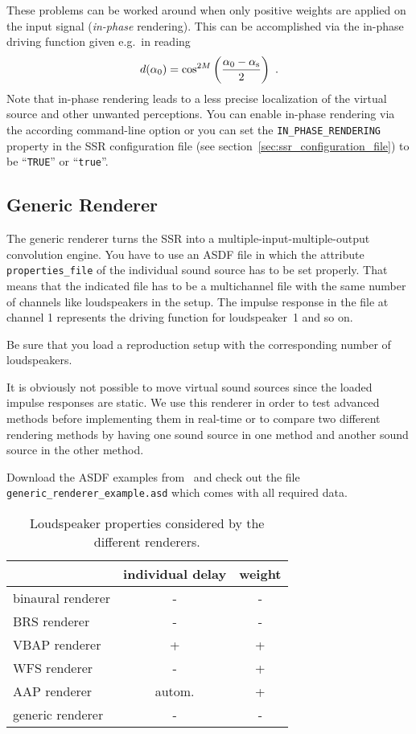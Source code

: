 These problems can be worked around when only positive weights are applied on
the input signal (\emph{in-phase} rendering). This can be accomplished via the
in-phase driving function given e.g.~in \cite{Neukom07} reading
%
\begin{equation}
d(\alpha_0) = \cos^{2M} \left (\frac{\alpha_0 - \alpha_\textnormal{s}}{2} \right ) \ . \nonumber
\end{equation}
%
Note that in-phase rendering leads to a less precise localization of the virtual source
and other unwanted perceptions. You can enable in-phase rendering via the according command-line
option or you can set
the \texttt{IN\_PHASE\_RENDERING} property in the SSR configuration file (see section~\ref{sec:ssr_configuration_file}) to be ``\texttt{TRUE}'' or ``\texttt{true}''.

\subsection{Generic Renderer}

The generic renderer turns the SSR into a multiple-input-multiple-output
convolution engine. You have to use an ASDF file in which the attribute
\texttt{properties\_file} of the individual sound source has to be set
properly. That means that the indicated file has to be a multichannel file with
the same number of channels like loudspeakers in the setup. The impulse
response in the file at channel 1 represents the driving function for
loudspeaker~1 and so on.

Be sure that you load a reproduction setup with the corresponding number of
loudspeakers.

It is obviously not possible to move virtual sound sources since the loaded
impulse responses are static. We use this renderer in order to test advanced
methods before implementing them in real-time or to compare two different
rendering methods by having one sound source in one method and another sound
source in the other method.

Download the ASDF examples from~\cite{ssr} and check out the file
\texttt{generic\_renderer\_example.asd} which comes with all required data.

\begin{table}%
\begin{center}
\begin{tabular}{| l | c | c |}
\hline
 & individual delay & weight \\
 \hline
 binaural renderer & - & - \\
 BRS renderer & - & - \\
 VBAP renderer & + & + \\
 WFS renderer & - & + \\
 AAP renderer & autom. & + \\
 generic renderer & - & - \\\hline
\end{tabular}
\caption{\label{tab:loudspeaker_properties}Loudspeaker properties
considered by the different renderers.}
\end{center}
\end{table}

